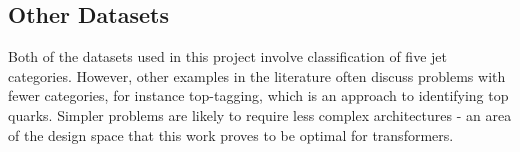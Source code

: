 \subsection{Other Datasets}
Both of the datasets used in this project involve classification of five jet categories. However, other examples in the literature often discuss problems with fewer categories, for instance top-tagging, which is an approach to identifying top quarks. Simpler problems are likely to require less complex architectures - an area of the design space that this work proves to be optimal for transformers.

